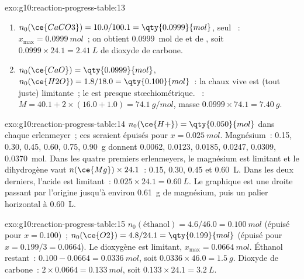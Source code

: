 \begin{solution}{exo:g10:reaction-progress-table:13}
\begin{enumerate}
  \item $n_0(\ce{CaCO3}) = 10.0 / 100.1 = \qty{0.0999}{mol}$, seul
        ~: $x_{\max} = \qty{0.0999}{mol}$~; on obtient
        \qty{0.0999}{mol} de  et de , soit
        $0.0999 \times 24.1 = \qty{2.41}{L}$ de dioxyde de carbone.
  \item $n_0(\ce{CaO}) = \qty{0.0999}{mol}$, $n_0(\ce{H2O}) = 1.8 / 18.0
        = \qty{0.100}{mol}$~: la chaux vive est (tout juste) limitante~;
        le  est presque stœchiométrique. ~:
        $M = 40.1 + 2 \times (16.0 + 1.0) = \qty{74.1}{g/mol}$, masse
        $0.0999 \times 74.1 = \qty{7.40}{g}$.
\end{enumerate}
\end{solution}

\begin{solution}{exo:g10:reaction-progress-table:14}
$n_0(\ce{H+}) = \qty{0.050}{mol}$ dans chaque erlenmeyer~; ces 
seraient épuisés pour $x = \qty{0.025}{mol}$. Magnésium~: 0.15, 0.30,
0.45, 0.60, 0.75, \qty{0.90}{g} donnent 0.0062, 0.0123, 0.0185, 0.0247,
0.0309, \qty{0.0370}{mol}. Dans les quatre premiers erlenmeyers, le
magnésium est limitant et le dihydrogène vaut $n(\ce{Mg}) \times 24.1$~:
0.15, 0.30, 0.45 et \qty{0.60}{L}. Dans les deux derniers, l'acide est
limitant~: $0.025 \times 24.1
= \qty{0.60}{L}$. Le graphique est une droite passant par l'origine
jusqu'à environ \qty{0.61}{g} de magnésium, puis un palier horizontal à
\qty{0.60}{L}.
\end{solution}

\begin{solution}{exo:g10:reaction-progress-table:15}
$n_0(\text{éthanol}) = 4.6 / 46.0 = \qty{0.100}{mol}$ (épuisé pour
$x = 0.100$)~; $n_0(\ce{O2}) = 4.8 / 24.1 = \qty{0.199}{mol}$ (épuisé
pour $x = 0.199/3 = 0.0664$). Le dioxygène est limitant,
$x_{\max} = \qty{0.0664}{mol}$. Éthanol restant~: $0.100 - 0.0664 =
\qty{0.0336}{mol}$, soit $0.0336 \times 46.0 = \qty{1.5}{g}$. Dioxyde de
carbone~: $2 \times 0.0664 = \qty{0.133}{mol}$, soit
$0.133 \times 24.1 = \qty{3.2}{L}$.
\end{solution}

